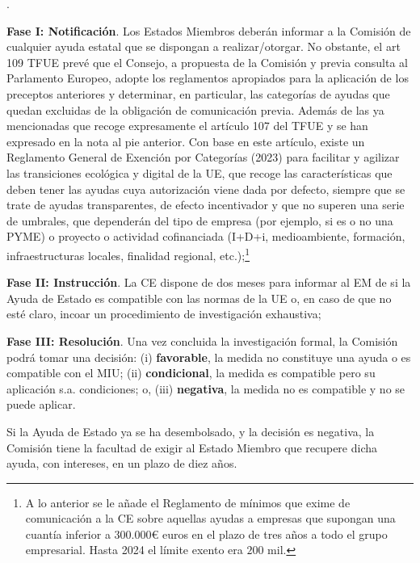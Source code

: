 \documentclass[10pt,a4paper]{article}
\newcounter{numitem}
\newenvironment{lnum}
      {\begin{list}{\arabic{numitem}.}{%
          \usecounter{numitem}%
          \setlength{\leftmargin}{1cm}%
          \setlength{\parskip}{3pt}%
          \setlength{\itemsep}{0pt}%
          \setlength{\parsep}{0pt}%
      }}
      {\end{list}}
\begin{document}
\begin{lnum}
    \item \textbf{Fase I: Notificación}. Los Estados Miembros deberán informar a la Comisión de cualquier ayuda estatal que se dispongan a realizar/otorgar. No obstante, el art 109 TFUE prevé que el Consejo, a propuesta de la Comisión y previa consulta al Parlamento Europeo, adopte los reglamentos apropiados para la aplicación de los preceptos anteriores y determinar, en particular, las categorías de ayudas que quedan excluidas de la obligación de comunicación previa. Además de las ya mencionadas que recoge expresamente el artículo 107 del TFUE y se han expresado en la nota al pie anterior. Con base en este artículo, existe un Reglamento General de Exención por Categorías (2023) para facilitar y agilizar las transiciones ecológica y digital de la UE, que recoge las características que deben tener las ayudas cuya autorización viene dada por defecto, siempre que se trate de ayudas transparentes, de efecto incentivador y que no superen una serie de umbrales, que dependerán del tipo de empresa (por ejemplo, si es o no una PYME) o proyecto o actividad cofinanciada (I+D+i, medioambiente, formación, infraestructuras locales, finalidad regional, etc.);\footnote{%
        A lo anterior se le añade el Reglamento de mínimos que exime de comunicación a la CE sobre aquellas ayudas a empresas que supongan una cuantía inferior a $300.000€$ euros en el plazo de tres años a todo el grupo empresarial. Hasta 2024 el límite exento era $200$ mil.
    }
    \item \textbf{Fase II: Instrucción}. La CE dispone de dos meses para informar al EM de si la Ayuda de Estado es compatible con las normas de la UE o, en caso de que no esté claro, incoar un procedimiento de investigación exhaustiva;
    \item \textbf{Fase III: Resolución}. Una vez concluida la investigación formal, la Comisión podrá tomar una decisión: (i) \textbf{favorable}, la medida no constituye una ayuda o es compatible con el MIU; (ii) \textbf{condicional}, la medida es compatible pero su aplicación s.a. condiciones; o, (iii) \textbf{negativa}, la medida no es compatible y no se puede aplicar. 
\end{lnum}

Si la Ayuda de Estado ya se ha desembolsado, y la decisión es negativa, la Comisión tiene la facultad de exigir al Estado Miembro que recupere dicha ayuda, con intereses, en un plazo de diez años.
\end{document}
